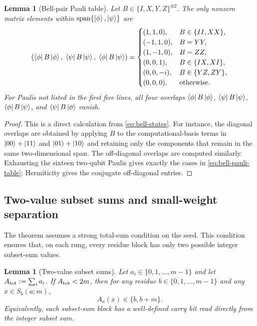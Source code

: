 \documentclass[11pt]{article}
\newcommand{\Span}{\operatorname{span}}
\newcommand{\ketphi}{\ket{\phi}}
\newcommand{\ketpsi}{\ket{\psi}}
\newtheorem{lemma}[theorem]{Lemma}
\begin{document}
\begin{lemma}[Bell-pair Pauli table]
\label{lem:bell-pauli}
Let $B\in\{I,X,Y,Z\}^{\otimes2}$.  The only nonzero matrix elements within
$\Span\{\ketphi,\ketpsi\}$ are
\begin{equation}
\left(\bra{\phi}B\ket{\phi},\;\bra{\psi}B\ket{\psi},\;\bra{\phi}B\ket{\psi}\right)=
\begin{cases}
(1,1,0), & B\in\{II,XX\},\\
(-1,1,0), & B=YY,\\
(1,-1,0), & B=ZZ,\\
(0,0,1), & B\in\{IX,XI\},\\
(0,0,-i), & B\in\{YZ,ZY\},\\
(0,0,0), & \text{otherwise.}
\end{cases}
\label{eq:bell-pauli-table}
\end{equation}
For Paulis not listed in the first five lines, all four overlaps
$\bra{\phi}B\ket{\phi}$, $\bra{\psi}B\ket{\psi}$,
$\bra{\phi}B\ket{\psi}$, and $\bra{\psi}B\ket{\phi}$ vanish.
\end{lemma}

\begin{proof}
This is a direct calculation from \eqref{eq:bell-states}.  For instance, the diagonal overlaps
are obtained by applying $B$ to the computational-basis terms in $\ket{00}+\ket{11}$ and
$\ket{01}+\ket{10}$ and retaining only the components that remain in the same two-dimensional
span.  The off-diagonal overlaps are computed similarly.  Exhausting the sixteen two-qubit
Paulis gives exactly the cases in \eqref{eq:bell-pauli-table}; Hermiticity gives the conjugate
off-diagonal entries.
\end{proof}

\subsection{Two-value subset sums and small-weight separation}

The theorem assumes a strong total-sum condition on the seed.  This condition ensures that, on
each rung, every residue block has only two possible integer subset-sum values.

\begin{lemma}[Two-value subset sums]
\label{lem:two-value-subsets}
Let $a_i\in\{0,1,\ldots,m-1\}$ and let $A_{\rm tot}:=\sum_i a_i$.  If
$A_{\rm tot}<2m$, then for any residue $b\in\{0,1,\ldots,m-1\}$ and any
$x\in S_b(a;m)$,
\begin{equation}
  A_a(x)\in\{b,b+m\}.
  \label{eq:two-values}
\end{equation}
Equivalently, each subset-sum block has a well-defined carry bit read directly from the integer
subset sum.
\end{lemma}
\end{document}
